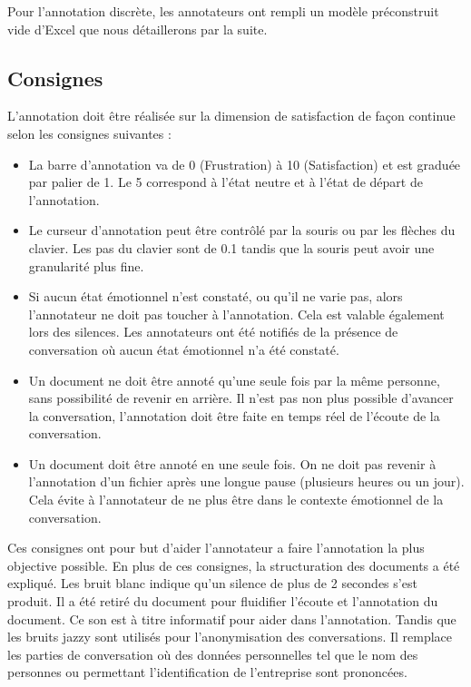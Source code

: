 Pour l'annotation discrète, les annotateurs ont rempli un modèle préconstruit vide d'Excel que nous détaillerons par la suite.

\subsection{Consignes}

L'annotation doit être réalisée sur la dimension de satisfaction de façon continue selon les consignes suivantes :
\begin{itemize}
  \item La barre d'annotation va de 0 (Frustration) à 10 (Satisfaction) et est graduée par palier de 1. Le 5 correspond à l'état neutre et à l'état de départ de l'annotation.
  \item Le curseur d'annotation peut être contrôlé par la souris ou par les flèches du clavier. Les pas du clavier sont de 0.1 tandis que la souris peut avoir une granularité plus fine.
  \item Si aucun état émotionnel n'est constaté, ou qu'il ne varie pas, alors l'annotateur ne doit pas toucher à l'annotation. Cela est valable également lors des silences. Les annotateurs ont été notifiés de la présence de conversation où aucun état émotionnel n'a été constaté.
  \item Un document ne doit être annoté qu'une seule fois par la même personne, sans possibilité de revenir en arrière. Il n'est pas non plus possible d'avancer la conversation, l'annotation doit être faite en temps réel de l'écoute de la conversation.
  \item Un document doit être annoté en une seule fois. On ne doit pas revenir à l'annotation d'un fichier après une longue pause (plusieurs heures ou un jour). Cela évite à l'annotateur de ne plus être dans le contexte émotionnel de la conversation.
\end{itemize}

Ces consignes ont pour but d'aider l'annotateur a faire l'annotation la plus objective possible. En plus de ces consignes, la structuration des documents a été expliqué. Les bruit blanc indique qu'un silence de plus de 2 secondes s'est produit. Il a été retiré du document pour fluidifier l'écoute et l'annotation du document. Ce son est à titre informatif pour aider dans l'annotation. Tandis que  les bruits jazzy sont utilisés pour l'anonymisation des conversations. Il remplace les parties de conversation où des données personnelles tel que le nom des personnes ou permettant l'identification de l'entreprise sont prononcées.

